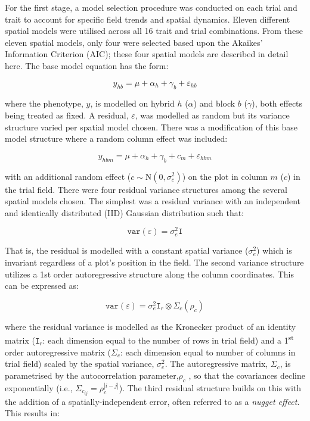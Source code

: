 \begin{refsection}
For the first stage, a model selection procedure was conducted on each trial and trait to account for specific field trends and spatial dynamics. Eleven different spatial models were utilised across all 16 trait and trial combinations. From these eleven spatial models, only four were selected based upon the Akaikes' Information Criterion (AIC); these four spatial models are described in detail here. The base model equation has the form:

\begin{equation}
y_{hb} = \mu +  \alpha_h +\gamma_b  + \varepsilon_{hb}
\label{eq:base-spatial-model}
\end{equation}

where the phenotype, \(y\), is modelled on hybrid \(h\) (\(\alpha\)) and block \(b\) (\(\gamma\)), both effects being treated as fixed. A residual, \(\varepsilon\), was modelled as random but its variance structure varied per spatial model chosen. There was a modification of this base model structure where a random column effect was included:

\begin{equation}
y_{hbm} = \mu +  \alpha_h +\gamma_b  +c_m + \varepsilon_{hbm}
\label{eq:base-spatial-model}
\end{equation}

with an additional random effect (\(c \sim \mathrm{N}(0,\sigma_c^2)\)) on the plot in column \(m\) (\(c\)) in the trial field.  There were four residual variance structures among the several spatial models chosen. The simplest was a residual variance with an independent and identically distributed (IID) Gaussian distribution such that:

\begin{equation}
\mathtt{var}(\varepsilon) = \sigma^2_e \mathtt I
\label{eq:iid-model}
\end{equation}

That is, the residual is modelled with a constant spatial variance (\(\sigma^2_e\)) which is invariant regardless of a plot's position in the field. The second variance structure utilizes a 1st order autoregressive structure along the column coordinates. This can be expressed as:

\begin{equation}
\mathtt{var}(\varepsilon) = \sigma^2_e \mathtt I_r\otimes\Sigma_c(\rho_c)  \label{eq:id-ar1-model}
\end{equation}

where the residual variance is modelled as the Kronecker product of an identity matrix (\(\mathtt I_r\): each dimension equal to the number of rows in trial field) and a 1\textsuperscript{st} order autoregressive matrix (\(\mathtt \Sigma_c\): each dimension equal to number of columns in trial field) scaled by the spatial variance, \(\sigma^2_e\). The autoregressive matrix, \(\Sigma_c\), is parametrised by the autocorrelation parameter,\(\rho_c\) , so that the covariances decline exponentially (i.e., \(\Sigma_{c_{ij}} = \rho_c^{|i - j|}\)). The third residual structure builds on this with the addition of a spatially-independent error, often referred to as a \emph{nugget effect}. This results in:


\end{refsection}
